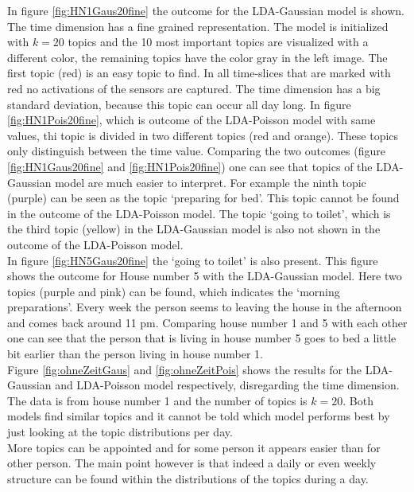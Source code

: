 In figure \ref{fig:HN1Gaus20fine} the outcome for the LDA-Gaussian model is shown. The time dimension has a fine grained representation. The model is initialized with $k=20$ topics and the 10 most important topics are visualized with a different color, the remaining topics have the color gray in the left image. The first topic (red) is an easy topic to find. In all time-slices that are marked with red no activations of the sensors are captured. The time dimension has a big standard deviation, because this topic can occur all day long. In figure \ref{fig:HN1Pois20fine}, which is outcome of the LDA-Poisson model with same values, thi topic is divided in two different topics (red and orange). These topics only distinguish between the time value. Comparing the two outcomes (figure \ref{fig:HN1Gaus20fine} and \ref{fig:HN1Pois20fine}) one can see that topics of the LDA-Gaussian model are much easier to interpret. For example the ninth topic (purple) can be seen as the topic `preparing for bed'. This topic cannot 
be 
found in the outcome of the LDA-Poisson model. The topic `going to toilet', which is the third topic (yellow) in the LDA-Gaussian model is also not shown in the outcome of the LDA-Poisson model.\\

In figure \ref{fig:HN5Gaus20fine} the `going to toilet' is also present. This figure shows the outcome for House number 5 with the LDA-Gaussian model. Here two topics (purple and pink) can be found, which indicates the `morning preparations'. Every week the person seems to leaving the house in the afternoon and comes back around 11 pm. Comparing house number 1 and 5 with each other one can see that the person that is living in house number 5 goes to bed a little bit earlier than the person living in house number 1.\\

Figure \ref{fig:ohneZeitGaus} and \ref{fig:ohneZeitPois} shows the results for the LDA-Gaussian and LDA-Poisson model respectively, disregarding the time dimension. The data is from house number 1 and the number of topics is $k=20$. Both models find similar topics and it cannot be told which model performs best by just looking at the topic distributions per day.\\

More topics can be appointed and for some person it appears easier than for other person. The main point however is that indeed a daily or even weekly structure can be found within the distributions of the topics during a day. 

